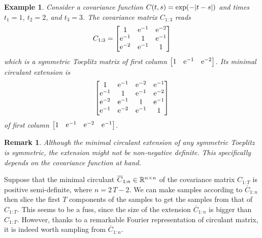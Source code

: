 \documentclass[]{article}
\newtheorem{remark}[theorem]{Remark}
\newtheorem{example}[theorem]{Example}
\begin{document}
\begin{example}
	Consider a covariance function $C(t,s) = \exp(-\lvert t - s\rvert)$ and times $t_1=1$, $t_2 = 2$, and $t_3 = 3$. The covariance matrix $C_{1:3}$ reads
	\begin{equation*}
		C_{1:3} = 
		\begin{bmatrix}
			1 & \mathrm{e}^{-1} & \mathrm{e}^{-2} \\
			\mathrm{e}^{-1} & 1 & \mathrm{e}^{-1} \\
			\mathrm{e}^{-2} & \mathrm{e}^{-1} & 1
		\end{bmatrix}
	\end{equation*}
	which is a symmetric Toeplitz matrix of first column $\begin{bmatrix} 1 & \mathrm{e}^{-1}	& \mathrm{e}^{-2}\end{bmatrix}$. Its minimal circulant extension is
	\begin{equation*}
		\begin{bmatrix}
			1 & \mathrm{e}^{-1} & \mathrm{e}^{-2} & \mathrm{e}^{-1}\\
			\mathrm{e}^{-1} & 1 & \mathrm{e}^{-1} & \mathrm{e}^{-2}\\
			\mathrm{e}^{-2} & \mathrm{e}^{-1} & 1 & \mathrm{e}^{-1}\\
			\mathrm{e}^{-1} & \mathrm{e}^{-2} & \mathrm{e}^{-1} & 1
		\end{bmatrix}
	\end{equation*} 
	of first column $\begin{bmatrix} 1 & \mathrm{e}^{-1}	& \mathrm{e}^{-2} & \mathrm{e}^{-1}\end{bmatrix}$.
\end{example}

\begin{remark}
	Although the minimal circulant extension of any symmetric Toeplitz is symmetric, the extension might not be non-negative definite. This specifically depends on the covariance function at hand.
\end{remark}

Suppose that the minimal circulant $\overline{C}_{1:n} \in \mathbb{R}^{n \times n}$ of the covariance matrix $C_{1:T}$ is positive semi-definite, where $n=2\,T-2$. We can make samples according to $\overline{C}_{1:n}$ then slice the first $T$ components of the samples to get the samples from that of $C_{1:T}$. This seems to be a fuss, since the size of the extension $\overline{C}_{1:n}$ is bigger than $C_{1:T}$. However, thanks to a remarkable Fourier representation of circulant matrix, it is indeed worth sampling from $\overline{C}_{1:n}$.
\end{document}

